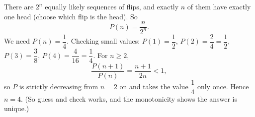 There are $2^n$ equally likely sequences of flips, and exactly $n$ of them have exactly one head (choose which flip is the head). So
\[
P(n)=\dfrac{n}{2^n}.
\]
We need $P(n)=\dfrac{1}{4}$. Checking small values: $P(1)=\dfrac{1}{2}$, $P(2)=\dfrac{2}{4}=\dfrac{1}{2}$, $P(3)=\dfrac{3}{8}$, $P(4)=\dfrac{4}{16}=\dfrac{1}{4}$. For $n\ge2$,
\[
\dfrac{P(n+1)}{P(n)}=\dfrac{n+1}{2n}<1,
\]
so $P$ is strictly decreasing from $n=2$ on and takes the value $\dfrac{1}{4}$ only once. Hence $n=\boxed{4}$. (So guess and check works, and the monotonicity shows the answer is unique.)
